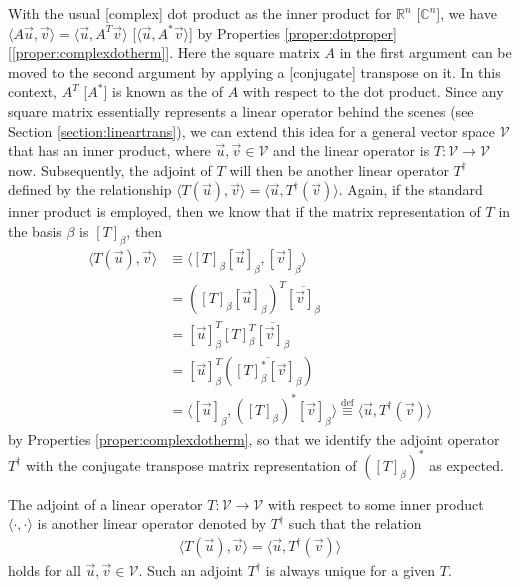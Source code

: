 With the usual [complex] dot product as the inner product for $\mathbb{R}^n$ [$\mathbb{C}^n$], we have $\langle A\vec{u}, \vec{v} \rangle = \langle \vec{u}, A^T\vec{v} \rangle$ [$\langle \vec{u}, A^*\vec{v} \rangle$] by Properties \ref{proper:dotproper} [\ref{proper:complexdotherm}]. Here the square matrix $A$ in the first argument can be moved to the second argument by applying a [conjugate] transpose on it. In this context, $A^T$ [$A^*$] is known as the  of $A$ with respect to the dot product. Since any square matrix essentially represents a linear operator behind the scenes (see Section \ref{section:lineartrans}), we can extend this idea for a general vector space $\mathcal{V}$ that has an inner product, where $\vec{u}, \vec{v} \in \mathcal{V}$ and the linear operator is $T: \mathcal{V} \to \mathcal{V}$ now. Subsequently, the adjoint of $T$ will then be another linear operator $T^\dag$ defined by the relationship $\langle T(\vec{u}), \vec{v} \rangle = \langle \vec{u}, T^\dag(\vec{v}) \rangle$. Again, if the standard inner product is employed, then we know that if the matrix representation of $T$ in the basis $\beta$ is $[T]_\beta$, then
\begin{align}
\langle T(\vec{u}), \vec{v} \rangle &\equiv \langle [T]_\beta[\vec{u}]_\beta, [\vec{v}]_\beta \rangle \nonumber \\
&= ([T]_\beta[\vec{u}]_\beta)^T\overline{[\vec{v}]_\beta} \nonumber \\
&= [\vec{u}]_\beta^T[T]_\beta^T\overline{[\vec{v}]_\beta} \nonumber \\
&= [\vec{u}]_\beta^T (\overline{[T]_\beta^*[\vec{v}]_\beta}) \nonumber \\
&= \langle [\vec{u}]_\beta, ([T]_\beta)^*[\vec{v}]_\beta \rangle \stackrel{\text{def}}{\equiv} \langle \vec{u}, T^\dag(\vec{v}) \rangle
\end{align}
by Properties \ref{proper:complexdotherm}, so that we identify the adjoint operator $T^\dag$ with the conjugate transpose matrix representation of $([T]_\beta)^*$ as expected.
\begin{defn}[Adjoint]
\label{defn:adjoint}
The adjoint of a linear operator $T: \mathcal{V} \to \mathcal{V}$ with respect to some inner product $\langle \cdot, \cdot \rangle$ is another linear operator denoted by $T^\dag$ such that the relation
\begin{align}
\langle T(\vec{u}), \vec{v} \rangle = \langle \vec{u}, T^\dag(\vec{v}) \rangle    
\end{align}
holds for all $\vec{u}, \vec{v} \in \mathcal{V}$. Such an adjoint $T^\dag$ is always unique for a given $T$. 
\end{defn}
